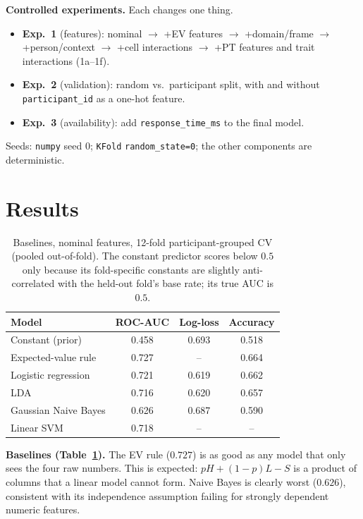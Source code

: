 \documentclass[11pt,a4paper]{article}
\begin{document}
\textbf{Controlled experiments.} Each changes one thing.
\begin{itemize}
\item \textbf{Exp.~1} (features): nominal $\to$ +EV features $\to$ +domain/frame $\to$ +person/context $\to$ +cell interactions $\to$ +PT features and trait interactions (1a--1f).
\item \textbf{Exp.~2} (validation): random vs.\ participant split, with and without \texttt{participant\_id} as a one-hot feature.
\item \textbf{Exp.~3} (availability): add \texttt{response\_time\_ms} to the final model.
\end{itemize}
Seeds: \texttt{numpy} seed 0; \texttt{KFold} \texttt{random\_state=0}; the other components are deterministic.

\section{Results}
\begin{table}[t]
\centering\small
\caption{Baselines, nominal features, 12-fold participant-grouped CV (pooled out-of-fold). The constant predictor scores below $0.5$ only because its fold-specific constants are slightly anti-correlated with the held-out fold's base rate; its true AUC is $0.5$.}\label{tab:base}
\begin{tabular}{lccc}
\toprule
Model & ROC-AUC & Log-loss & Accuracy\\
\midrule
Constant (prior) & 0.458 & 0.693 & 0.518\\
Expected-value rule & 0.727 & -- & 0.664\\
Logistic regression & 0.721 & 0.619 & 0.662\\
LDA & 0.716 & 0.620 & 0.657\\
Gaussian Naive Bayes & 0.626 & 0.687 & 0.590\\
Linear SVM & 0.718 & -- & --\\
\bottomrule
\end{tabular}
\end{table}

\textbf{Baselines (Table~\ref{tab:base}).} The EV rule ($0.727$) is as good as any model that only sees the four raw numbers. This is expected: $pH+(1-p)L-S$ is a product of columns that a linear model cannot form. Naive Bayes is clearly worst ($0.626$), consistent with its independence assumption failing for strongly dependent numeric features.
\end{document}
